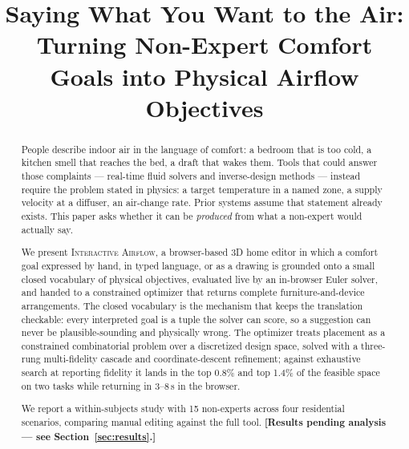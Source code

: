 \documentclass[manuscript,review,anonymous]{acmart}
\begin{document}
\title{Saying What You Want to the Air: Turning Non-Expert Comfort Goals into
  Physical Airflow Objectives}


% 

\renewcommand{\shortauthors}{Anonymous et al.}

\begin{abstract}
People describe indoor air in the language of comfort: a bedroom that is too
cold, a kitchen smell that reaches the bed, a draft that wakes them. Tools that
could answer those complaints — real-time fluid solvers and inverse-design
methods — instead require the problem stated in physics: a target temperature in
a named zone, a supply velocity at a diffuser, an air-change rate. Prior systems
assume that statement already exists. This paper asks whether it can be
\emph{produced} from what a non-expert would actually say.

We present \textsc{Interactive Airflow}, a browser-based 3D home editor in which
a comfort goal expressed by hand, in typed language, or as a drawing is grounded
onto a small closed vocabulary of physical objectives, evaluated live by an
in-browser Euler solver, and handed to a constrained optimizer that returns
complete furniture-and-device arrangements. The closed vocabulary is the
mechanism that keeps the translation checkable: every interpreted goal is a
tuple the solver can score, so a suggestion can never be plausible-sounding and
physically wrong. The optimizer treats placement as a constrained combinatorial
problem over a discretized design space, solved with a three-rung multi-fidelity
cascade and coordinate-descent refinement; against exhaustive search at
reporting fidelity it lands in the top 0.8\% and top 1.4\% of the feasible space
on two tasks while returning in 3--8\,s in the browser.

We report a within-subjects study with 15 non-experts across four residential
scenarios, comparing manual editing against the full tool. \textbf{[Results
pending analysis --- see Section~\ref{sec:results}.]}
\end{abstract}
\end{document}
